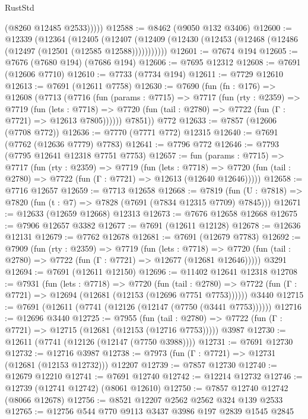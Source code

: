 \begin{lexlean}{RustStd}
\begin{coremodule}
            (@8260 @12485 @2533)))))
@12588 := @8462 (@9050 @132 @3406)
@12600 := @12339
    (@12364
      (@12405
        (@12407 (@12409 (@12430 (@12453 (@12468 (@12486 (@12497 (@12501 (@12585 @12588)))))))))))
@12601 := @7674 @194
@12605 := @7676 (@7680 @194) (@7686 @194)
@12606 := @7695 @12312
@12608 := @7691 (@12606 @7710)
@12610 := @7733 (@7734 @194)
@12611 := @7729 @12610
@12613 := @7691 (@12611 @7758)
@12630 := @7690
    (fun (fn : @176) =>
    @12608
      (@7713
        (@7716
          (fun (params : @7715) =>
          @7717
            (fun (rty : @2359) =>
            @7719
              (fun (lets : @7718) =>
              @7720 (fun (tail : @2780) => @7722 (fun (Γ : @7721) => @12613 @7805))))))
        @7851))
    @772
@12633 := @7857 (@12606 (@7708 @772))
@12636 := @7770 (@7771 @772) @12315
@12640 := @7691 (@7762 (@12636 @7779) @7783)
@12641 := @7796 @772
@12646 := @7793 (@7795 @12641 @12318 @7751 @7753)
@12657 := fun (params : @7715) =>
  @7717
    (fun (rty : @2359) =>
    @7719
      (fun (lets : @7718) =>
      @7720 (fun (tail : @2780) => @7722 (fun (Γ : @7721) => @12613 (@12640 @12646)))))
@12658 := @7716 @12657
@12659 := @7713 @12658
@12668 := @7819
    (fun (U : @7818) => @7820 (fun (t : @7) => @7828 (@7691 (@7834 @12315 @7709) @7845)))
@12671 := @12633 (@12659 @12668) @12313
@12673 := @7676 @12658 @12668
@12675 := @7906 @12657 @3382
@12677 := @7691 (@12611 @12128)
@12678 := @12636 @12131
@12679 := @7762 @12678
@12681 := @7691 (@12679 @7783)
@12692 := @7909
    (fun (rty : @2359) =>
    @7719
      (fun (lets : @7718) =>
      @7720 (fun (tail : @2780) => @7722 (fun (Γ : @7721) => @12677 (@12681 @12646)))))
    @3291
@12694 := @7691 (@12611 @12150)
@12696 := @11402 @12641 @12318
@12708 := @7931
    (fun (lets : @7718) =>
    @7720
      (fun (tail : @2780) =>
      @7722 (fun (Γ : @7721) => @12694 (@12681 (@12153 (@12696 @7751 @7753))))))
    @3440
@12715 := @7691 (@12611 (@7741 (@12126 (@12147 (@7750 (@3441 @7753))))))
@12716 := @12696 @3440
@12725 := @7955
    (fun (tail : @2780) => @7722 (fun (Γ : @7721) => @12715 (@12681 (@12153 (@12716 @7753)))))
    @3987
@12730 := @12611 (@7741 (@12126 (@12147 (@7750 @3988))))
@12731 := @7691 @12730
@12732 := @12716 @3987
@12738 := @7973 (fun (Γ : @7721) => @12731 (@12681 (@12153 @12732))) @12207
@12739 := @7857 @12730
@12740 := @12679 @12210
@12741 := @7691 @12740
@12742 := @12214 @12732
@12746 := @12739 (@12741 @12742) (@8061 @12610)
@12750 := @7857 @12740 @12742 (@8066 @12678)
@12756 := @8521 @12207 @2562 @2562 @324 @139 @2533
@12765 := @12756 @544 @770 @9113 @3437 @3986 @197 @2839 @1545 @2845

\end{coremodule}
\end{lexlean}

